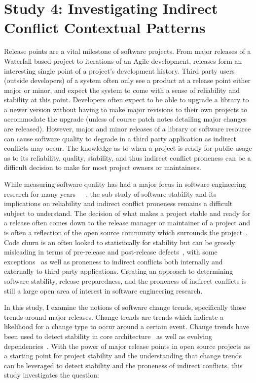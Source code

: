 \section{Study 4: Investigating Indirect Conflict Contextual Patterns}
\label{study:apie}

Release points are a vital milestone of software projects. From major releases of a Waterfall based project to iterations of an Agile development,
releases form an interesting single point of a project's development history.
Third party users (outside developers) of a system often only see a product at a release point either major or minor,
and expect the system to come with a sense of reliability and stability at this point. Developers often expect to be able to upgrade a library to
a newer version without having to make major revisions to their own projects to accommodate the upgrade (unless of course patch notes detailing major
changes are released). However, major and minor releases of a library or software resource can cause software quality to degrade in
a third party application as indirect conflicts may occur. The knowledge as to when a project is ready for public usage
as to its reliability, quality, stability, and thus indirect conflict proneness can be a difficult decision to make for most project owners or maintainers.

While measuring software quality has had a major focus in software engineering research for many years~\cite{Bowen:1978:CAS}~\cite{Grady:1993:PRM}~\cite{ISOIEC9126},
the sub study of software stability and its implications on reliability and indirect conflict proneness remains a difficult subject to understand. 
The decision of what makes a project stable and ready
for a release often comes down to the release manager or maintainer of a project and is often a reflection of the open source community which surrounds 
the project~\cite{Conway:1968}. Code churn is an often looked to statistically for stability but can be grossly misleading
in terms of pre-release and post-release defects~\cite{Fenton:2000:QAF}, with some exceptions~\cite{Nagappan:2005:URC} as well as proneness to indirect conflicts
both internally and externally to third party applications. 
Creating an approach to determining software stability, release preparedness, and the proneness of indirect conflicts is still a large open area of
interest in software engineering research.

In this study, I examine the notions of software change trends, specifically those trends around major releases. Change trends are trends which indicate
a likelihood for a change type to occur around a certain event. Change trends have been used to detect
stability in core architecture~\cite{Wermelinger:2008:AEE} as well as evolving dependencies~\cite{Businge:2010:ESE}.
With the power of major release points in open source projects as a starting point for project stability and the understanding that change trends can
be leveraged to detect stability and the proneness of indirect conflicts, this study investigates the question:

